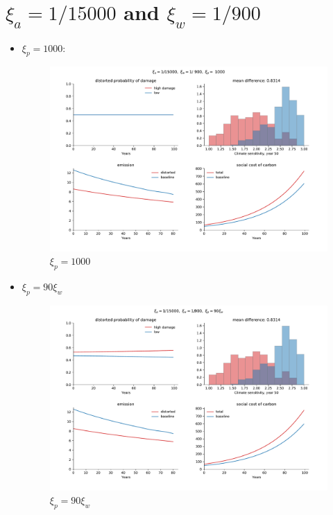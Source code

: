 \documentclass{article}
\begin{document}
\section{\(\xi_a= 1/15000\) and \(\xi_w=1/900\)}\label{sec:sec2}
\begin{itemize}
    \item \(\xi_p= 1000\):
        \begin{figure}[H]
            \centering
            \includegraphics[width=\linewidth]{notebook/15_900_1000.pdf}
            \caption{\(\xi_p=1000\)}
            \label{fig:notebook/15_900_90}
        \end{figure}
        \newpage
    \item \(\xi_p= 90\xi_w\)
        \begin{figure}[H]
            \centering
            \includegraphics[width=\linewidth]{notebook/15_900_90.pdf}
            \caption{\(\xi_p=90\xi_w\)}

\end{figure}
\end{itemize}
\end{document}
